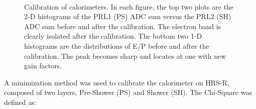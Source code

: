  \begin{figure}[!ht]
  \begin{center}
   \\
   \caption[Calibration of calorimeters]{\footnotesize{Calibration of calorimeters. In each figure, the top two plots are the 2-D histograms of the PRL1 (PS) ADC sum versus the PRL2 (SH) ADC sum before and after the calibration. The electron band is clearly isolated after the calibration. The bottom two 1-D histograms are the distributions of E/P before and after the calibration. The peak becomes sharp and locates at one with new gain factors.}}
   \label{calo_cali}
  \end{center}
\end{figure}
 A minimization method was used to calibrate the calorimeter on HRS-R, composed of two layers, Pre-Shower (PS) and Shower (SH)\cite{shower_ak}. The Chi-Square was defined as: 
